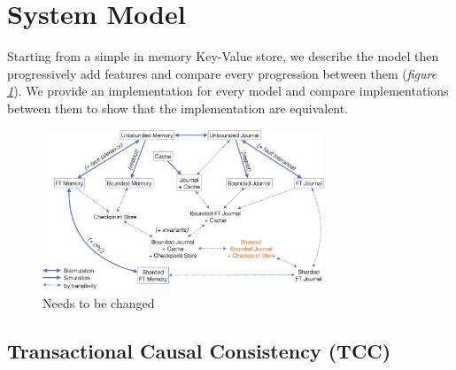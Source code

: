 \documentclass[systeme,french,english]{compas2022}
\begin{document}



\section{System Model}

Starting from a simple in memory Key-Value store, we describe the model then progressively add features and compare every progression between them (\emph{figure \ref{fig:transitions}}).
We provide an implementation for every model and compare implementations between them to show that the implementation are equivalent.

\begin{figure}[tp]
  \centering
  \includegraphics[width=0.75\textwidth]{figures/transitions.png}
  \caption{Needs to be changed}
  \label{fig:transitions}
\end{figure}

\subsection{Transactional Causal Consistency (TCC)}
\end{document}
